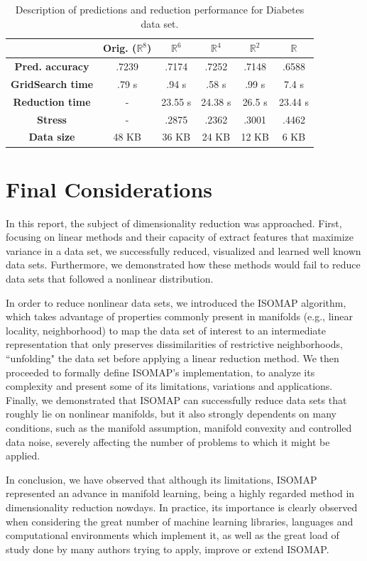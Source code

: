\documentclass[12pt]{report}
\begin{document}
\begin{table}[H]
	\centering
	\begin{tabular}{|c|c|c|c|c|c|}
		\hline
		& \textbf{Orig. ($\mathbb{R}^{8}$}) & \textbf{$\mathbb{R}^{6}$} & \textbf{$\mathbb{R}^{4}$} & \textbf{$\mathbb{R}^{2}$} & \textbf{$\mathbb{R}$} \\\hline
		\textbf{Pred. accuracy}   & .7239 & .7174 & .7252 & .7148 & .6588 \\\hline
		\textbf{GridSearch time}   & .79 s & .94 s & .58 s & .99 s & 7.4 s \\\hline
		\textbf{Reduction time}    & - & 23.55 s & 24.38 s & 26.5 s & 23.44 s \\\hline
		\textbf{Stress} & - & .2875 & .2362 & .3001 & .4462 \\\hline
		\textbf{Data size}  & 48 KB & 36 KB & 24 KB & 12 KB & 6 KB \\\hline
	\end{tabular}
	\captionsetup{justification=centering}
	\caption{Description of predictions and reduction performance for Diabetes data set.}
\end{table}

\newpage
\setcounter{secnumdepth}{-1}
\chapter{Final Considerations}

In this report, the subject of dimensionality reduction was approached. First, focusing on linear methods and their capacity of extract features that maximize variance in a data set, we successfully reduced, visualized and learned well known data sets. Furthermore, we demonstrated how these methods would fail to reduce data sets that followed a nonlinear distribution.

In order to reduce nonlinear data sets, we introduced the ISOMAP algorithm, which takes advantage of properties commonly present in manifolds (e.g., linear locality, neighborhood) to map the data set of interest to an intermediate representation that only preserves dissimilarities of restrictive neighborhoods, ``unfolding" the data set before applying a linear reduction method. We then proceeded to formally define ISOMAP's implementation, to analyze its complexity and present some of its limitations, variations and applications. Finally, we demonstrated that ISOMAP can successfully reduce data sets that roughly lie on nonlinear manifolds, but it also strongly dependents on many conditions, such as the manifold assumption, manifold convexity and controlled data noise, severely affecting the number of problems to which it might be applied.

In conclusion, we have observed that although its limitations, ISOMAP represented an advance in manifold learning, being a highly regarded method in dimensionality reduction nowdays. In practice, its importance is clearly observed when considering the great number of machine learning libraries, languages and computational environments which implement it, as well as the great load of study done by many authors trying to apply, improve or extend ISOMAP.

\newpage



\end{document}
